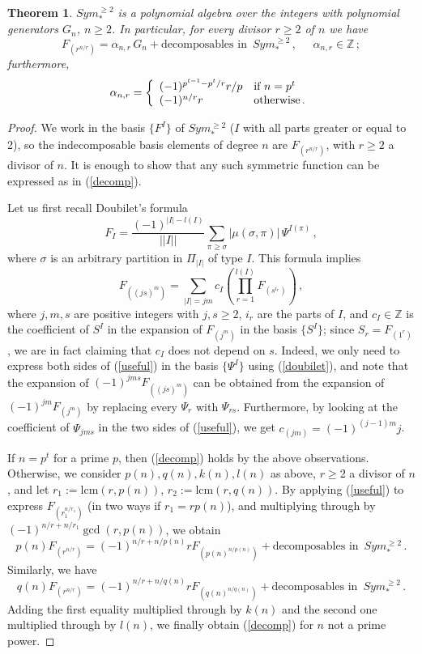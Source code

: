 \documentclass[a4paper,12pt]{amsart}
\newtheorem{thm}[equation]{Theorem}
\theoremstyle{definition}
\numberwithin{equation}{section}
\newcommand{\bZ}{{\mathbb Z}}
\newcommand{\s}{\sigma}
\newcommand{\case}[5]{#1#2 \left\{ \begin{array}{ll} #3 &\mbox{if $#4$} \\ #5 &\mbox{otherwise\,.} \end{array} \right.}
\newcommand{\spa}{\;\:}
\begin{document}
\begin{thm}
$Sym_*^{\ge 2}$ is a polynomial algebra over the integers with polynomial generators $G_n$, $n\ge 2$. In particular, for every divisor $r\ge 2$ of $n$ we have
\begin{equation}\label{decomp}
F_{(r^{n/r})}=\alpha_{n,r}\,G_n+\mbox{decomposables in}\spa Sym_*^{\ge 2}\,,\;\;\;\;\;\alpha_{n,r}\in\bZ\,;
\end{equation}
furthermore, 
\[\case{\alpha_{n,r}}{=}{(-1)^{p^{t-1}-p^t/r}r/p}{n=p^t}{(-1)^{n/r}r}\]
\end{thm}
\begin{proof}
We work in the basis $\{F^I\}$ of $Sym_*^{\ge 2}$ ($I$ with all parts greater or equal to 2), so the indecomposable basis elements of degree $n$ are $F_{(r^{n/r})}$, with $r\ge 2$ a divisor of $n$. It is enough to show that any such symmetric function can be expressed as in (\ref{decomp}). 

Let us first recall Doubilet's formula
\begin{equation}\label{doubilet}
F_I=\frac{(-1)^{|I|-l(I)}}{||I||}\sum_{\pi\ge\s}|\mu(\s,\pi)|\,\varPsi^{I(\pi)}\,,
\end{equation}
where $\s$ is an arbitrary partition in $\varPi_{|I|}$ of type $I$. This formula implies
\begin{equation}\label{useful}
F_{((js)^m)}=\sum_{|I|=jm} c_I\left(\prod_{r=1}^{l(I)} F_{(s^{i_r})}\right)\,,
\end{equation}
where $j,m,s$ are positive integers with $j,s\ge 2$, $i_r$ are the parts of $I$, and $c_I\in\bZ$ is the coefficient of $S^I$ in the expansion of $F_{(j^m)}$ in the basis $\{S^I\}$; since $S_r=F_{(1^r)}$, we are in fact claiming that $c_I$ does not depend on $s$. Indeed, we only need to express both sides of (\ref{useful}) in the basis $\{\varPsi^I\}$ using (\ref{doubilet}), and note that the expansion of $(-1)^{jms}F_{((js)^m)}$ can be obtained from the expansion of $(-1)^{jm}F_{(j^m)}$ by replacing every $\varPsi_r$ with $\varPsi_{rs}$. Furthermore, by looking at the coefficient of $\varPsi_{jms}$ in the two sides of (\ref{useful}), we get $c_{(jm)}=(-1)^{(j-1)m}j$. 

If $n=p^t$ for a prime $p$, then (\ref{decomp}) holds by the above observations. Otherwise, we consider $p(n), q(n), k(n), l(n)$ as above, $r\ge 2$ a divisor of $n$, and let $r_1:=\mbox{lcm}(r,p(n))$, $r_2:=\mbox{lcm}(r,q(n))$. By applying (\ref{useful}) to express $F_{\left(r_1^{n/r_1}\right)}$ (in two ways if $r_1=rp(n)$), and multiplying through by $(-1)^{n/r+n/r_1}\gcd(r,p(n))$, we obtain
\[ p(n)F_{(r^{n/r})}=(-1)^{n/r+n/p(n)}r F_{(p(n)^{n/p(n)})}+\mbox{decomposables in}\spa Sym_*^{\ge 2} \,.\]
Similarly, we have
\[ q(n)F_{(r^{n/r})}=(-1)^{n/r+n/q(n)}r F_{(q(n)^{n/q(n)})}+\mbox{decomposables in}\spa Sym_*^{\ge 2}\,.\]
Adding the first equality multiplied through by $k(n)$ and the second one multiplied through by $l(n)$, we finally obtain (\ref{decomp}) for $n$ not a prime power.


\end{proof}
\end{document}
